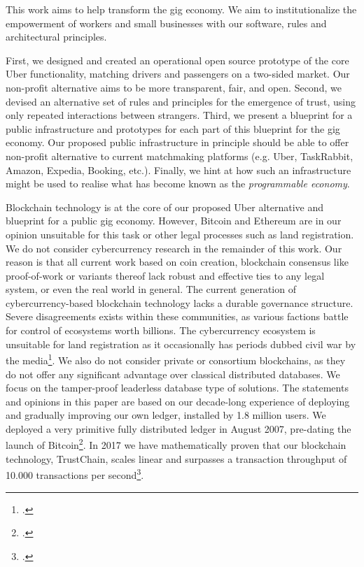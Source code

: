 \documentclass[USenglish]{article}
\begin{document}
This work aims to help transform the gig economy.
We aim to institutionalize the empowerment of workers and small businesses with our software, rules and architectural principles.

First, we designed and created an operational open source prototype of the core Uber functionality, matching drivers and passengers on a two-sided market.
Our non-profit alternative aims to be more transparent, fair, and open.
Second, we devised an alternative set of rules and principles for the emergence of trust, using only repeated interactions between strangers.
Third, we present a blueprint for a public infrastructure and prototypes for each part of this blueprint for the gig economy.
Our proposed public infrastructure in principle should be able to offer non-profit alternative to current matchmaking platforms (e.g. Uber, TaskRabbit, Amazon, Expedia, Booking, etc.).
Finally, we hint at how such an infrastructure might be used to realise what has become known as the \emph{programmable economy}.

Blockchain technology is at the core of our proposed Uber alternative and blueprint for a public gig economy.
However, Bitcoin and Ethereum are in our opinion unsuitable for this task or other legal processes such as land registration.
We do not consider cybercurrency research in the remainder of this work.
Our reason is that all current work based on coin creation, blockchain consensus like proof-of-work or variants thereof lack robust and effective ties to any legal system, or even the real world in general.
The current generation of cybercurrency-based blockchain technology lacks a durable governance structure.
Severe disagreements exists within these communities, as various factions battle for control of ecosystems worth billions.
The cybercurrency ecosystem is unsuitable for land registration as it occasionally has periods dubbed civil war by the media\footcite{bloombergbitcoinsplinter}.
We also do not consider private or consortium blockchains, as they do not offer any significant advantage over classical distributed databases.
We focus on the tamper-proof leaderless database type of solutions.
The statements and opinions in this paper are based on our decade-long experience of deploying and gradually improving our own ledger, installed by 1.8 million users.
We deployed a very primitive fully distributed ledger in August 2007, pre-dating the launch of Bitcoin\footcite{bbcnewstribler}.
In 2017 we have mathematically proven that our blockchain technology, TrustChain, scales linear and surpasses a transaction throughput of 10.000 transactions per second\footcite{githubissueconsensus}.
\end{document}

